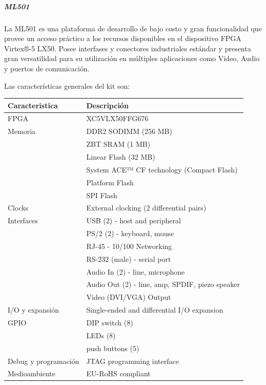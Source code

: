 				\subparagraph{ML501}
				La ML501 es una plataforma de desarrollo de bajo costo y gran funcionalidad que provee un acceso práctico a los recursos disponibles en el
				dispositivo FPGA Virtex®-5 LX50. Posee interfases y conectores industriales estándar y presenta gran versatilidad para su utilización en
				múltiples aplicaciones como Video, Audio y puertos de comunicación.
				
				Las características generales del kit son:
			
			\begin{tabular}{ p{4cm} p{10cm} }
			\rowcolor[gray]{0.8} Caracteristica & Descripción \\		
			\hline FPGA & XC5VLX50FFG676\\
			\hline Memoria & DDR2 SODIMM (256 MB)\\
			\hline 		   & ZBT SRAM (1 MB)\\
			\hline 		   & Linear Flash (32 MB)\\
			\hline         & System ACE™ CF technology (Compact Flash)\\
			\hline         & Platform Flash\\
			\hline         & SPI Flash\\
			\hline Clocks  & External clocking (2 differential pairs)\\
			\hline Interfaces & USB (2) - host and peripheral\\
			\hline 			  & PS/2 (2) - keyboard, mouse\\
			\hline 			  & RJ-45 - 10/100 Networking\\
			\hline 			  & RS-232 (male) - serial port\\
			\hline 			  & Audio In (2) - line, microphone\\
			\hline 			  & Audio Out (2) - line, amp, SPDIF, piezo speaker\\
			\hline 			  & Video (DVI/VGA) Output\\
			\hline I/O y expansión & Single-ended and differential I/O expansion\\
			\hline GPIO		&  DIP switch (8)\\
			\hline 			&  LEDs (8)\\
			\hline 			&  push buttons (5)\\
			\hline Debug y programación & JTAG programming interface\\
			\hline Medioambiente & EU-RoHS compliant \\
			\end{tabular}
				
